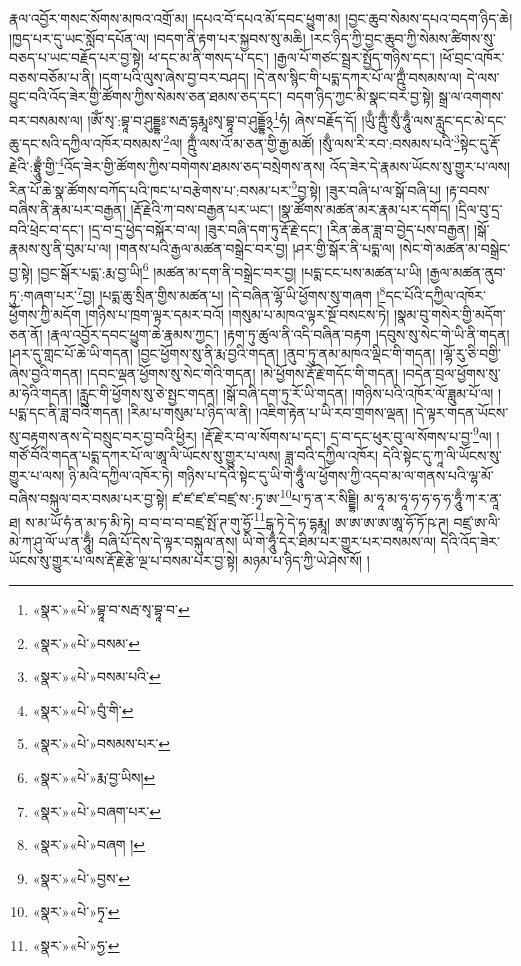 རྣལ་འབྱོར་གསང་སོགས་མཁའ་འགྲོ་མ། །དཔའ་བོ་དཔའ་མོ་དབང་ཕྱུག་མ། །བྱང་ཆུབ་སེམས་དཔའ་བདག་ཉིད་ཆེ། །ཁྱད་པར་དུ་ཡང་སློབ་དཔོན་ལ། །བདག་ནི་རྟག་པར་སྐྱབས་སུ་མཆི། །རང་ཉིད་ཀྱི་བྱང་ཆུབ་ཀྱི་སེམས་ཚིགས་སུ་བཅད་པ་ཡང་བརྗོད་པར་བྱ་སྟེ། ཕ་དང་མ་ནི་གསད་པ་དང་། །རྒྱལ་པོ་གཙང་སྦྲར་སྤྱོད་གཉིས་དང་། །ཕོ་བྲང་འཁོར་བཅས་བཅོམ་པ་ནི། །དག་པའི་ལུས་ཞེས་བྱ་བར་བཤད། །དེ་ནས་སྙིང་གི་པདྨ་དཀར་པོ་ལ་ཀྵུྃ་བསམས་ལ། དེ་ལས་བྱུང་བའི་འོད་ཟེར་གྱི་ཚོགས་ཀྱིས་སེམས་ཅན་ཐམས་ཅད་དང་། བདག་ཉིད་ཀྱང་མི་སྣང་བར་བྱ་སྟེ། སྒྲ་ལ་འགགས་བར་བསམས་ལ། །ཨོཾ་སྭ་:བྷཱ་བ་ཤུདྡྷཿ་སརྦ་དྷརྨཱཿསྭ་བྷཱ་བ་ཤུདྡྷོ྅\footnote{«སྣར་»«པེ་»བྷཱ་བ་སརྦ་སྭ་བྷཱ་བ་}ཧཾ། ཞེས་བརྗོད་དོ། །ཡུྃ་ཀྵུྃ་སུྃ་ཧཱུྃ་ལས་རླུང་དང་མེ་དང་ཆུ་དང་སའི་དཀྱིལ་འཁོར་བསམས་\footnote{«སྣར་»«པེ་»བསམ་}ལ། ཀྵུྃ་ལས་འོ་མ་ཅན་གྱི་རྒྱ་མཚོ། །སུྃ་ལས་རི་རབ་:བསམས་པའི་\footnote{«སྣར་»«པེ་»བསམ་པའི་}སྟེང་དུ་རྡོ་རྗེའི་:བྷྲཱུྃ་གྱི་\footnote{«སྣར་»«པེ་»བུཾ་གི་}འོད་ཟེར་གྱི་ཚོགས་ཀྱིས་བགེགས་ཐམས་ཅད་བསྲེགས་ནས། འོད་ཟེར་དེ་རྣམས་ཡོངས་སུ་གྱུར་པ་ལས། རིན་པོ་ཆེ་སྣ་ཚོགས་བཀོད་པའི་ཁང་པ་བརྩེགས་པ་:བསམ་པར་\footnote{«སྣར་»«པེ་»བསམས་པར་}བྱ་སྟེ། །ཟུར་བཞི་པ་ལ་སྒོ་བཞི་པ། །རྟ་བབས་བཞིས་ནི་རྣམ་པར་བརྒྱན། །རྡོ་རྗེའི་ཀ་བས་བརྒྱན་པར་ཡང་། །སྣ་ཚོགས་མཚན་མར་རྣམ་པར་དགོད། །དྲིལ་བུ་དྲ་བའི་ཕྲེང་བ་དང་། །དྲ་བ་དྲ་ཕྱེད་བསྐོར་བ་ལ། །ཟུར་བཞི་དག་ཏུ་རྡོ་རྗེ་དང་། །རིན་ཆེན་ཟླ་བ་བྱེད་པས་བརྒྱན། །སྒོ་རྣམས་སུ་ནི་བུམ་པ་ལ། །གནས་པའི་རྒྱལ་མཚན་བསྒྲེང་བར་བྱ། །ཤར་གྱི་སྒོར་ནི་པདྨ་ལ། །སེང་གེ་མཚན་མ་བསྒྲེང་བྱ་སྟེ། །བྱང་སྒོར་པདྨ་:རྨ་བྱ་ཡི།\footnote{«སྣར་»«པེ་»རྨ་བྱ་ཡིས།} །མཚན་མ་དག་ནི་བསྒྲེང་བར་བྱ། །པདྨ་ངང་པས་མཚན་པ་ཡི། །རྒྱལ་མཚན་ནུབ་ཏུ་:གཞག་པར་\footnote{«སྣར་»«པེ་»བཞག་པར་}བྱ། །པདྨ་ཆུ་སྲིན་གྱིས་མཚན་པ། །དེ་བཞིན་ལྷོ་ཡི་ཕྱོགས་སུ་གཞག །\footnote{«སྣར་»«པེ་»བཞག །}དང་པོའི་དཀྱིལ་འཁོར་ཕྱོགས་ཀྱི་མདོག །གཉིས་པ་ཁྲག་ལྟར་དམར་བའོ། །གསུམ་པ་མཁའ་ལྟར་སྔོ་བསངས་ཏེ། །སྣམ་བུ་གསེར་གྱི་མདོག་ཅན་ནོ། །རྣལ་འབྱོར་དབང་ཕྱུག་ཆེ་རྣམས་ཀྱང་། །རྟག་ཏུ་ཚུལ་ནི་འདི་བཞིན་བརྟག །དབུས་སུ་སེང་གེ་ཡི་ནི་གདན། །ཤར་དུ་གླང་པོ་ཆེ་ཡི་གདན། །བྱང་ཕྱོགས་སུ་ནི་རྨ་བྱའི་གདན། །ནུབ་ཏུ་ནམ་མཁའ་ལྡིང་གི་གདན། །ལྷོ་རུ་ཅི་བགྱི་ཞེས་བྱའི་གདན། །དབང་ལྡན་ཕྱོགས་སུ་སེང་གེའི་གདན། །མེ་ཕྱོགས་རྡོ་རྗེ་གདོང་གི་གདན། །བདེན་བྲལ་ཕྱོགས་སུ་མ་ཧེའི་གདན། །རླུང་གི་ཕྱོགས་སུ་ཅེ་སྤྱང་གདན། །སྒོ་བཞི་དག་ཏུ་རོ་ཡི་གདན། །གཉིས་པའི་འཁོར་ལོ་ཟླུམ་པོ་ལ། །པདྨ་དང་ནི་ཟླ་བའི་གདན། །རིམ་པ་གསུམ་པ་ཉིད་ལ་ནི། །འཇིག་རྟེན་པ་ཡི་རབ་གྲགས་ལྡན། །དེ་ལྟར་གདན་ཡོངས་སུ་བརྟགས་ནས་དེ་བསྲུང་བར་བྱ་བའི་ཕྱིར། །རྡོ་རྗེ་ར་བ་ལ་སོགས་པ་དང་། དྲ་བ་དང་ཕུར་བུ་ལ་སོགས་པ་བྱ་\footnote{«སྣར་»«པེ་»བྱས་}ལ། །གཙོ་བོའི་གདན་པདྨ་དཀར་པོ་ལ་ཨཱ་ལི་ཡོངས་སུ་གྱུར་པ་ལས། ཟླ་བའི་དཀྱིལ་འཁོར། དེའི་སྟེང་དུ་ཀཱ་ལི་ཡོངས་སུ་གྱུར་པ་ལས། ཉི་མའི་དཀྱིལ་འཁོར་ཏེ། གཉིས་པ་དེའི་སྟེང་དུ་ཡི་གེ་ཧཱུྃ་ལ་ཕྱོགས་ཀྱི་འདབ་མ་ལ་གནས་པའི་ལྷ་མོ་བཞིས་བསྐུལ་བར་བསམ་པར་བྱ་སྟེ། ཛ་ཛ་ཛ་ཛ་བཛྲ་ས་:ཏྭ་ཨ་\footnote{«སྣར་»«པེ་»ཏྭ་}པ་ཏྲ་ན་ར་སིདྡྷི། མ་ཧཱ་མ་ཧཱ་ཧ་ཧ་ཧ་ཧ་ཧཱུྃ་ཀ་ར་ནཱ་ཐ། ས་མ་ཡོ་ཧཾ་ན་མ་ཏ་མི་ཏེ། བ་བ་བ་བ་བཛྲ་སྤོ་ཊ་གུ་ཧྱོ་\footnote{«སྣར་»«པེ་»ཧྱ་}ངྒ་ཏེ་དེ་ཧ་དྷརྨཱ། ཨ་ཨ་ཨ་ཨ་ཨཱ་ཧོ་ཏོ་ཥ་ཊ། བཛྲ་ཨ་ལི་མེ་ཀ་ཤུ་ལོ་ཡ་ན་ཧཱུྃ། བཞི་པོ་དེས་དེ་ལྟར་བསྐུལ་ནས། ཡི་གེ་ཧཱུྃ་དེར་ཐིམ་པར་གྱུར་པར་བསམས་ལ། དེའི་འོད་ཟེར་ཡོངས་སུ་གྱུར་པ་ལས་རྡོ་རྗེ་རྩེ་ལྔ་པ་བསམ་པར་བྱ་སྟེ། མཉམ་པ་ཉིད་ཀྱི་ཡེ་ཤེས་སོ། །
